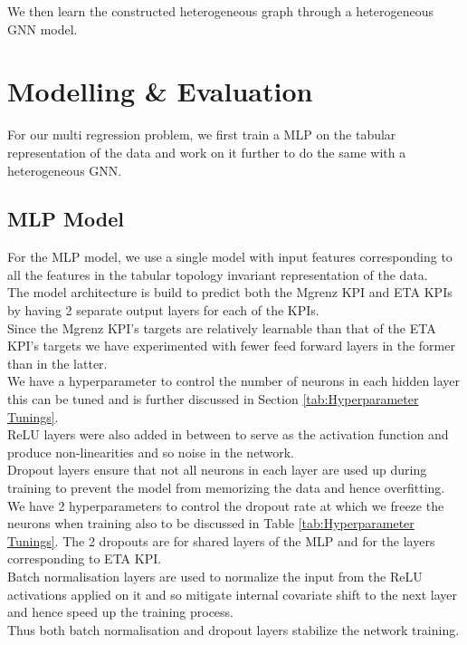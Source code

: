 \documentclass{report} %
\begin{document}
We then learn the constructed heterogeneous graph through a heterogeneous \ac{GNN} model.\\   

\newpage 
\chapter{Modelling \& Evaluation}

For our multi regression problem, we first train a \ac{MLP} on the tabular representation of the data and work on it further to do the same with a heterogeneous \ac{GNN}.

\section{\ac{MLP} Model}\label{sec:MLP Model}

For the \ac{MLP} model, we use a single model with input features corresponding to all the features in the tabular topology invariant representation of the data.\\
The model architecture is build to predict both the Mgrenz \ac{KPI} and ETA \ac{KPI}s by having 2 separate output layers for each of the \ac{KPI}s. \\
Since the Mgrenz \ac{KPI}'s targets are relatively learnable than that of the ETA \ac{KPI}'s targets we have experimented with fewer feed forward layers in the former than in the latter. \\
We have a hyperparameter to control the number of neurons in each hidden layer this can be tuned and is further discussed in Section \ref{tab:Hyperparameter Tunings}.\\
\ac{ReLU} layers were also added in between to serve as the activation function and produce non-linearities and so noise in the network. \\
Dropout layers ensure that not all neurons in each layer are used up during training to prevent the model from memorizing the data and hence overfitting.  
We have 2 hyperparameters to control the dropout rate at which we freeze the neurons when training also to be discussed in Table \ref{tab:Hyperparameter Tunings}.
The 2 dropouts are for shared layers of the \ac{MLP} and for the layers corresponding to ETA \ac{KPI}.\\
Batch normalisation layers are used to normalize the input from the \ac{ReLU} activations applied on it and so mitigate internal covariate shift to the next layer and hence speed up the training process.\\
Thus both batch normalisation and dropout layers stabilize the network training.\\
\end{document}
